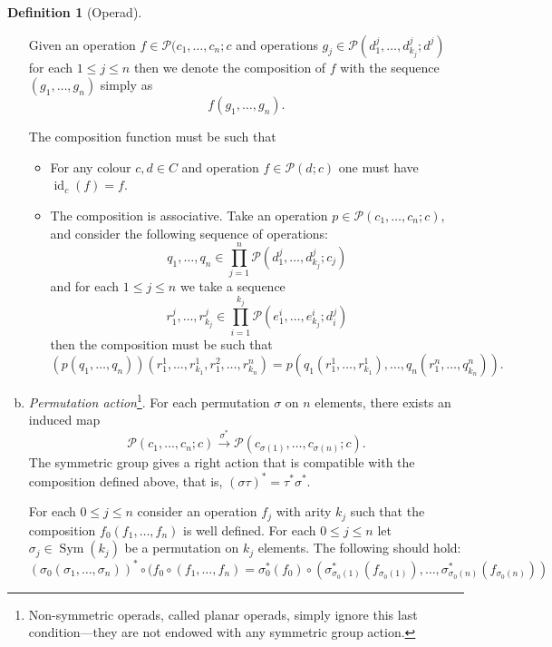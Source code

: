 \documentclass[11pt, reqno]{amsart}
\theoremstyle{definition}
\newtheorem{definition}[theorem]{Definition}
\renewcommand{\leq}{\leqslant}
\DeclareMathOperator{\Id}{id}     %
\DeclareMathOperator{\Sym}{Sym} %
\newcommand{\operad}{\mathcal}
\begin{document}
\begin{definition}[Operad]
\begin{enumerate}[(a)]
    Given an operation \(f \in \operad P(c_1, \dots, c_n; c\) and operations
    \(g_j \in \operad P(d_{1}^j, \dots, d_{k_j}^j; d^j)\) for each \(1 \leq j
    \leq n\) then we denote the composition of \(f\) with the sequence \((g_1,
    \dots, g_n)\) simply as
    \[
    f (g_1, \dots, g_n).
    \]

    The composition function must be such that
    \begin{itemize}
        \item For any colour \(c, d \in C\) and operation \(f \in \operad P(d; c)\)
            one must have \(\Id_c(f) = f\).

        \item The composition is associative. Take an operation \(p \in \operad P(c_1,
            \dots, c_n; c)\), and consider the following sequence of operations:
            \[
                q_1, \dots, q_n \in \prod_{j=1}^n \operad P(d_1^j, \dots, d_{k_j}^j; c_j)
            \]
            and for each \(1 \leq j \leq n\) we take a sequence
            \[
                r_1^j, \dots, r_{k_j}^j \in 
                \prod_{i=1}^{k_j} \operad P(e_1^i, \dots, e_{k_j}^i; d_i^j)
            \]
            then the composition must be such that
            \[
                (p(q_1, \dots, q_n))(r_1^1, \dots, r_{k_1}^1, r_1^2, \dots, r_{k_n}^n)
                = p(q_1(r_1^1, \dots, r_{k_1}^1), \dots, q_n(r_1^n, \dots, q_{k_n}^n)).
            \]
    \end{itemize}


    \item \emph{Permutation action}\footnote{Non-symmetric operads, called planar
        operads, simply ignore this last condition---they are not endowed with any
    symmetric group action.}. For each permutation \(\sigma\) on \(n\) elements,
    there exists an induced map
    \[
        \operad P(c_1, \dots, c_n; c)
        \overset{\sigma^{*}}\longrightarrow
        \operad P(c_{\sigma(1)}, \dots, c_{\sigma(n)}; c).
    \]
    The symmetric group gives a right action that is compatible with the
    composition defined above, that is, \((\sigma \tau)^* = \tau^* \sigma^*\).

    For each \(0 \leq j \leq n\) consider an operation \(f_j\) with arity \(k_j\)
    such that the composition \(f_0 (f_1, \dots, f_n)\) is well defined. For each
    \(0 \leq j \leq n\) let \(\sigma_j \in \Sym(k_j)\) be a permutation on \(k_j\)
    elements. The following should hold:
    \[
        (\sigma_0 (\sigma_1, \dots, \sigma_n))^*
        \circ (f_0 \circ (f_1, \dots, f_n)
        =
        \sigma_0^*(f_0) \circ 
        (\sigma_{\sigma_0(1)}^*(f_{\sigma_0(1)}),
        \dots,
        \sigma_{\sigma_0(n)}^*(f_{\sigma_0(n)}))
    \]
\end{enumerate}
\end{definition}
\end{document}
